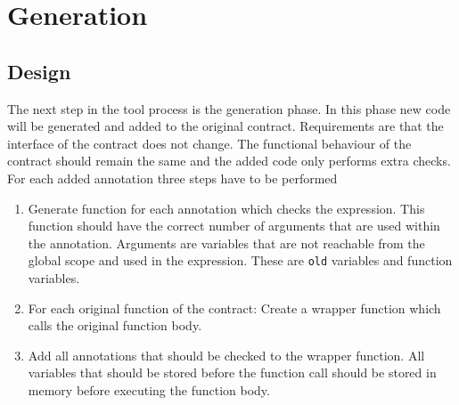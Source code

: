 \documentclass[a4paper]{article}
\begin{document}
\section{Generation}
\label{sec:generation}
\subsection{Design}
The next step in the tool process is the generation phase. In this phase new code will be generated and added to the original contract. Requirements are that the interface of the contract does not change. The functional behaviour of the contract should remain the same and the added code only performs extra checks. For each added annotation three steps have to be performed
\begin{enumerate}
  \item Generate function for each annotation which checks the expression. This function should have the correct number of arguments that are used within the annotation. Arguments are variables that are not reachable from the global scope and used in the expression. These are \texttt{old} variables and function variables.
  \item For each original function of the contract: Create a wrapper function which calls the original function body.
  \item Add all annotations that should be checked to the wrapper function. All variables that should be stored before the function call should be stored in memory before executing the function body. 
\end{enumerate}
\end{document}
